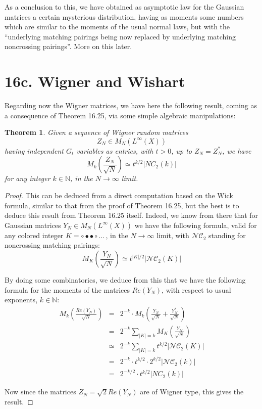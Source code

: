 \documentclass[12pt]{amsbook}
\newtheorem{theorem}{Theorem}[chapter]
\begin{document}
As a conclusion to this, we have obtained as asymptotic law for the Gaussian matrices a certain mysterious distribution, having as moments some  numbers which are similar to the moments of the usual normal laws, but with the ``underlying matching pairings being now replaced by underlying matching noncrossing pairings''. More on this later.

\section*{16c. Wigner and Wishart}
 
Regarding now the Wigner matrices, we have here the following result, coming as a consequence of Theorem 16.25, via some simple algebraic manipulations:

\begin{theorem}
Given a sequence of Wigner random matrices
$$Z_N\in M_N(L^\infty(X))$$
having independent $G_t$ variables as entries, with $t>0$, up to $Z_N=Z_N^*$, we have
$$M_k\left(\frac{Z_N}{\sqrt{N}}\right)\simeq t^{k/2}|NC_2(k)|$$
for any integer $k\in\mathbb N$, in the $N\to\infty$ limit.
\end{theorem}

\begin{proof}
This can be deduced from a direct computation based on the Wick formula, similar to that from the proof of Theorem 16.25, but the best is to deduce this result from Theorem 16.25 itself. Indeed, we know from there that for Gaussian matrices $Y_N\in M_N(L^\infty(X))$ we have the following formula, valid for any colored integer $K=\circ\bullet\bullet\circ\ldots\,$, in the $N\to\infty$ limit, with $\mathcal{NC}_2$ standing for noncrossing matching pairings:
$$M_K\left(\frac{Y_N}{\sqrt{N}}\right)\simeq t^{|K|/2}|\mathcal{NC}_2(K)|$$

By doing some combinatorics, we deduce from this that we have the following formula for the moments of the matrices $Re(Y_N)$, with respect to usual exponents, $k\in\mathbb N$:
\begin{eqnarray*}
M_k\left(\frac{Re(Y_N)}{\sqrt{N}}\right)
&=&2^{-k}\cdot M_k\left(\frac{Y_N}{\sqrt{N}}+\frac{Y_N^*}{\sqrt{N}}\right)\\
&=&2^{-k}\sum_{|K|=k}M_K\left(\frac{Y_N}{\sqrt{N}}\right)\\
&\simeq&2^{-k}\sum_{|K|=k}t^{k/2}|\mathcal{NC}_2(K)|\\
&=&2^{-k}\cdot t^{k/2}\cdot 2^{k/2}|\mathcal{NC}_2(k)|\\
&=&2^{-k/2}\cdot t^{k/2}|NC_2(k)|
\end{eqnarray*}

Now since the matrices $Z_N=\sqrt{2}Re(Y_N)$ are of Wigner type, this gives the result.
\end{proof}
\end{document}
